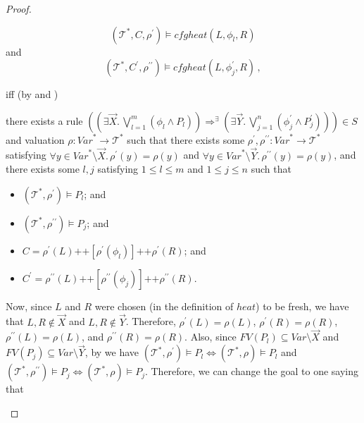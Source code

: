 \documentclass{article}
\newenvironment{proofenv}
  {
    \VerbatimEnvironment\begin{tcolorbox}[colback=black!0!white] %
  }
  {
   \end{tcolorbox}
  }
\begin{document}
\begin{proof}
\begin{proofenv}
\begin{equation*}
        (\mathcal{T}^*, C, \rho^\prime) \vDash \mathit{cfgheat}(L, \phi_l, R)
    \end{equation*}
    and
    \begin{equation*}
        (\mathcal{T}^*, C^\prime, \rho^{\prime\prime}) \vDash
        \mathit{cfgheat}(L, \phi^\prime_j, R) \, ,
    \end{equation*}
\end{proofenv}
iff (by  and )
\begin{proofenv}
    there exists a rule $((\exists \vec{X}.\, \bigvee_{l=1}^{m} (\phi_l \land P_l)) \Rightarrow^\exists (\exists \vec{Y}.\, \bigvee_{j=1}^{n} (\phi^\prime_j \land P^\prime_j))) \in S$
    and valuation $\rho : \mathit{Var}^* \to \mathcal{T}^*$ such that
    there exists some $\rho^\prime,\rho^{\prime\prime} : \mathit{Var}^* \to \mathcal{T}^*$
    satisfying $\forall y \in \mathit{Var}^* \setminus \vec{X}.\, \rho^\prime(y) = \rho(y)$
    and $\forall y \in \mathit{Var}^* \setminus \vec{Y}.\, \rho^{\prime\prime}(y) = \rho(y)$,
    and there exists some $l,j$ satisfying $1 \leq l \leq m$ and $1 \leq j \leq n$ such that
    \begin{itemize}
        \item $(\mathcal{T}^*, \rho^\prime) \vDash P_l$; and
        \item $(\mathcal{T}^*, \rho^{\prime\prime}) \vDash P_j$; and
        \item $C = \rho^\prime(L) \texttt{++} [\rho^\prime(\phi_l)] \texttt{++} \rho^\prime(R)$; and
        \item $C^\prime = \rho^{\prime\prime}(L)
        \texttt{++} [\rho^{\prime\prime}(\phi_j)] \texttt{++} \rho^{\prime\prime}(R)$.
    \end{itemize}
\end{proofenv}
Now, since $L$ and $R$ were chosen (in the definition of $\mathit{heat}$) to be fresh, we have that
$L,R \not\in \vec{X}$ and $L,R \not\in \vec{Y}$. Therefore,
$\rho^\prime(L) = \rho(L)$, $\rho^\prime(R) = \rho(R)$,
$\rho^{\prime\prime}(L) = \rho(L)$, and $\rho^{\prime\prime}(R) = \rho(R)$.
Also, since $\mathit{FV}(P_l) \subseteq \mathit{Var} \setminus \vec{X}$
and $\mathit{FV}(P_j) \subseteq \mathit{Var} \setminus \vec{Y}$,
by  we have $(\mathcal{T}^*, \rho^\prime) \vDash P_l \iff (\mathcal{T}^*, \rho) \vDash P_l$
and $(\mathcal{T}^*, \rho^{\prime\prime}) \vDash P_j \iff (\mathcal{T}^*, \rho) \vDash P_j$.
Therefore, we can change the goal to one saying that
\begin{proofenv}

\end{proofenv}
\end{proof}
\end{document}
